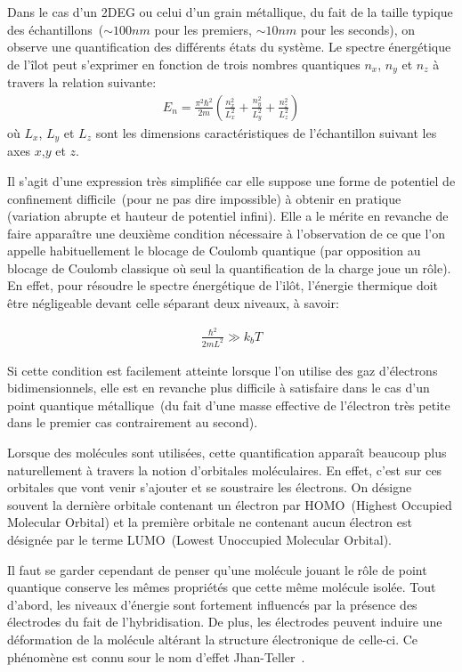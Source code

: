 Dans le cas d'un 2DEG ou celui d'un grain métallique, du fait de la taille typique des échantillons~($\sim 100nm$ pour les premiers, $\sim 10nm$ pour les seconds), on observe une quantification des différents états du système. Le spectre énergétique de l'\^ilot peut s'exprimer en fonction de trois nombres quantiques $n_x$, $n_y$ et $n_z$ à travers la relation suivante:
\begin{eqnarray}
E_n = \frac{\pi^2 \hbar^2}{2m}(\frac{n_x^2}{L_x^2} + \frac{n_y^2}{L_y^2} + \frac{n_z^2}{L_z^2}) \nonumber
\end{eqnarray}
où $L_x$, $L_y$ et $L_z$ sont les dimensions caractéristiques de l'échantillon suivant les axes $x$,$y$ et $z$.

Il s'agit d'une expression très simplifiée car elle suppose une forme de potentiel de confinement difficile~(pour ne pas dire impossible) à obtenir en pratique (variation abrupte et hauteur de potentiel infini). Elle a le mérite en revanche de faire appara\^itre une deuxième condition nécessaire à l'observation de ce que l'on appelle habituellement le blocage de Coulomb quantique (par opposition au blocage de Coulomb classique où seul la quantification de la charge joue un rôle). En effet, pour résoudre le spectre énergétique de l'il\^ot, l'énergie thermique doit \^etre négligeable devant celle séparant deux niveaux, à savoir:

\begin{eqnarray}
\frac{\hbar^2}{2mL^2} \gg k_bT \nonumber
\end{eqnarray}

Si cette condition est facilement atteinte lorsque l'on utilise des gaz d'électrons bidimensionnels, elle est en revanche plus difficile à satisfaire dans le cas d'un point quantique métallique~(du fait d'une masse effective de l'électron très petite dans le premier cas contrairement au second). \newline


Lorsque des molécules sont utilisées, cette quantification apparaît beaucoup plus naturellement à travers la notion d'orbitales moléculaires. En effet, c'est sur ces orbitales que vont venir s'ajouter et se soustraire les électrons. On désigne souvent la dernière orbitale contenant un électron par HOMO~(Highest Occupied Molecular Orbital) et la première orbitale ne contenant aucun électron est désignée par le terme LUMO~(Lowest Unoccupied Molecular Orbital).

Il faut se garder cependant de penser qu'une molécule jouant le r\^ole de point quantique conserve les mêmes propriétés que cette m\^eme molécule isolée. Tout d'abord, les niveaux d'énergie sont fortement influencés par la présence des électrodes du fait de l'hybridisation. De plus, les électrodes peuvent induire une déformation de la molécule altérant la structure électronique de celle-ci. Ce phénomène est connu sour le nom d'effet Jhan-Teller~\cite{Jahn1937}. 

